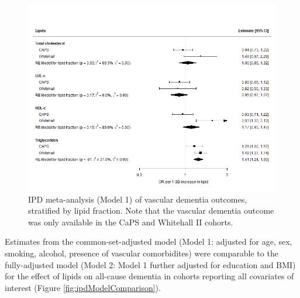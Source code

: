 \documentclass[a4paper, twoside]{templates/ociamthesis}
\begin{document}
\begin{figure}[H]
\includegraphics[width=1\linewidth]{figures/ipd/main_vasdem} \caption[IPD meta-analysis of all-cause dementia, stratified by lipid fraction]{IPD meta-analysis (Model 1) of vascular dementia outcomes, stratified by lipid fraction. Note that the vascular dementia outcome was only available in the CaPS and Whitehall II cohorts.}\label{fig:mainEffectVad}
\end{figure}

Estimates from the common-set-adjusted model (Model 1: adjusted for age, sex, smoking, alcohol, presence of vascular comorbidites) were comparable to the fully-adjusted model (Model 2: Model 1 further adjusted for education and BMI) for the effect of lipids on all-cause dementia in cohorts reporting all covariates of interest (Figure \ref{fig:ipdModelComparison}).
\end{document}
